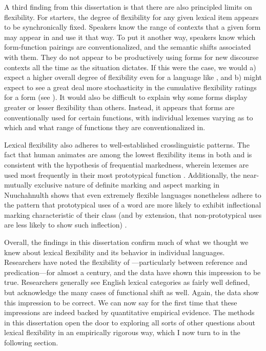 A third finding from this dissertation is that there are also principled limits on flexibility. For starters, the degree of flexibility for any given lexical item appears to be synchronically fixed. Speakers know the range of contexts that a given form may appear in and use it that way. To put it another way, speakers know which form-function pairings are conventionalized, and the semantic shifts associated with them. They do not appear to be productively using forms for new discourse contexts all the time as the situation dictates. If this were the case, we would a) expect a higher overall degree of flexibility even for a language like , and b) might expect to see a great deal more stochasticity in the cumulative flexibility ratings for a form (see ). It would also be difficult to explain why some forms display greater or lesser flexibility than others. Instead, it appears that forms are conventionally used for certain functions, with individual lexemes varying as to which and what range of functions they are conventionalized in.

Lexical flexibility also adheres to well-established crosslinguistic patterns. The fact that human animates are among the lowest flexibility items in both  and  is consistent with the hypothesis of frequential markedness, wherein lexemes are used most frequently in their most prototypical function \parencites{Croft1991}{Croft2000}{Croft2001b}{CroftLier2012}. Additionally, the near-mutually exclusive nature of definite marking and aspect marking in Nuuchahnulth shows that even extremely flexible languages nonetheless adhere to the pattern that prototypical uses of a word are more likely to exhibit inflectional marking characteristic of their class (and by extension, that non-prototypical uses are less likely to show such inflection) \parencite{HopperThompson1984}.

Overall, the findings in this dissertation confirm much of what we thought we knew about lexical flexibility and its behavior in individual languages. Researchers have noted the flexibility of —particularly between reference and predication—for almost a century, and the data have shown this impression to be true. Researchers generally see English lexical categories as fairly well defined, but acknowledge the many cases of functional shift as well. Again, the data show this impression to be correct. We can now say for the first time that these impressions are indeed backed by quantitative empirical evidence. The methods in this dissertation open the door to exploring all sorts of other questions about lexical flexibility in an empirically rigorous way, which I now turn to in the following section.

